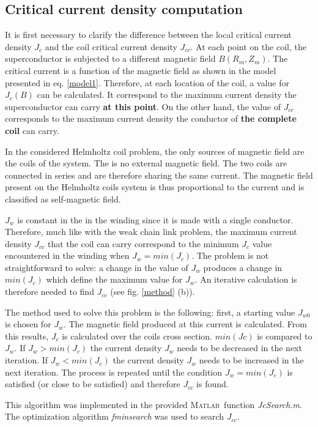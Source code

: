 \documentclass{ws-jmrr}
\newcommand{\MATLAB}{\textsc{Matlab}}
\begin{document}
\begin{multicols}{2}
\subsection{Critical current density computation}
\label{jccalc}
It is first necessary to clarify the difference between the local critical current density $J_c$ and the coil critical current density $J_{cc}$. At each point on the coil, the superconductor is subjected to a different magnetic field $B(R_m,Z_m)$. The critical current is a function of the magnetic field as shown in the model presented in eq. \ref{model1}. Therefore, at each location of the coil, a value for $J_c(B)$ can be calculated. It correspond to the maximum current density the superconductor can carry \textbf{at this point}. On the other hand, the value of $J_{cc}$ corresponds to the maximum current density the conductor of \textbf{the complete coil} can carry.\par
In the considered Helmholtz coil problem, the only sources of magnetic field are the coils of the system. The is no external magnetic field. The two coils are connected in series and are therefore sharing the same current. The magnetic field present on the Helmholtz coils system is thus proportional to the current and is classified as self-magnetic field.\par
$J_w$ is constant in the in the winding since it is made with a single conductor. Therefore, much like with the weak chain link problem, the maximum current density $J_{cc}$ that the coil can carry correspond to the minimum $J_c$ value encountered in the winding when $J_w=min(J_c)$. The problem is not straightforward to solve: a change in the value of $J_w$ produces a change in $min(J_c)$ which define the maximum value for $J_w$. An iterative calculation is therefore needed to find $J_{cc}$ (see fig. \ref{method} (b)).\par
The method used to solve this problem is the following: first, a starting value $J_{w0}$ is chosen for $J_{w}$. The magnetic field produced at this current is calculated. From this results, $J_c$ is calculated over the coils cross section. $min(Jc)$ is compared to $J_w$. If $J_w>min(J_c)$ the current density $J_w$ needs to be decreased in the next iteration. If $J_w<min(J_c)$ the current density $J_w$ needs to be increased in the next iteration. The process is repeated until the condition $J_w=min(J_c)$ is satisfied (or close to be satisfied) and therefore $J_{cc}$ is found.\par
This algorithm was implemented in the provided \MATLAB ~function \emph{JcSearch.m}. The optimization algorithm \emph{fminsearch} was used to search $J_{cc}$.

\end{multicols}
\end{document}
